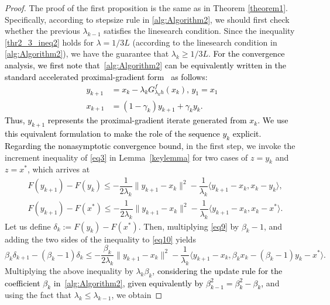 \documentclass[11pt, a4paper, oneside, reqno]{amsart}
\begin{document}
\begin{proof}
The proof of the first proposition is the same as in Theorem \ref{theorem1}. Specifically, according to stepsize rule in \ref{alg:Algorithm2}, we should first check whether the previous $\lambda_{k-1}$ satisfies the linesearch condition. Since the inequality \eqref{thr2_3_ineq2} holds for $\lambda = {1}/{3L}$ (according to the linesearch condition in \ref{alg:Algorithm2}), we have the guarantee that $\lambda_k \geq {1}/{3L}$. %
\textcolor{black}{For the convergence analysis, we first note that~\ref{alg:Algorithm2} can be equivalently written in the standard accelerated proximal-gradient form~\cite[Section~10.7]{Beck2017} as follows:
\begin{align}\label{eq: Nes-like iter}
y_{k+1} &= x_k - \lambda_k G^{f}_{\lambda_k h}(x_k),\, y_1 = x_1\nonumber\\
x_{k+1} &= (1-\gamma_k)y_{k+1}+\gamma_k y_k.
\end{align}
Thus, $y_{k+1}$ represents the proximal-gradient iterate generated from $x_k$. We use this equivalent formulation to make the role of the sequence ${y_k}$ explicit. Regarding the nonasymptotic convergence bound,} in the first step, we invoke the increment inequality of \ref{eq3} in Lemma~\ref{keylemma} for two cases of $z = y_{k}$ and $z = x^*$, which arrives at
\begin{subequations}
\begin{align}
    & F(y_{k+1}) - F(y_{k}) \leq -\dfrac{1}{2\lambda_k} \|y_{k+1} - x_k\|^2 - \dfrac{1}{\lambda_k}\langle y_{k+1} -x_k, x_k - y_{k} \rangle, \label{eq9} \\
    & F(y_{k+1}) - F(x^*) \leq -\dfrac{1}{2\lambda_k} \|y_{k+1} - x_k\|^2 - \dfrac{1}{\lambda_k}\langle y_{k+1} -x_k, x_k - x^*\rangle. \label{eq10}
\end{align}
\end{subequations}
Let us define $\delta_k := F(y_{k}) - F(x^*)$. Then, multiplying \eqref{eq9} by $\beta_k - 1$, and adding the two sides of the inequality to \eqref{eq10} yields
\begin{equation*}
    \beta_k \delta_{k+1} - (\beta_k - 1)\delta_k \leq - \dfrac{\beta_k}{2\lambda_k}\|y_{k+1} - x_k\|^2 - \dfrac{1}{\lambda_k}\langle y_{k+1} - x_k, \beta_k x_k - (\beta_k - 1)y_{k} - x^* \rangle.
\end{equation*}
Multiplying the above inequality by $\lambda_k \beta_k$, \textcolor{black}{considering the update rule for the coefficient $\beta_k$ in~\ref{alg:Algorithm2}, given equivalently by $\beta_{k-1}^2 = \beta_k^2 - \beta_k$,} and using the fact that $\lambda_k \leq \lambda_{k-1}$, we obtain

\end{proof}
\end{document}
